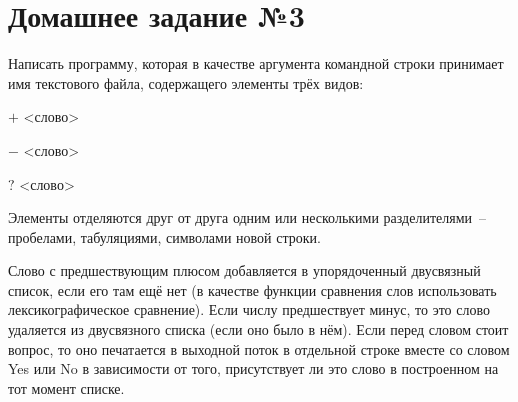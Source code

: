 \section*{Домашнее задание №3}


Написать программу, которая в качестве аргумента командной строки
принимает имя текстового файла, содержащего элементы трёх видов:
\begin{description}
\item{$+$} <слово>
\item{$-$} <слово>
\item{$?$} <слово>
\end{description}

Элементы отделяются друг от друга одним или несколькими
разделителями~-- пробелами, табуляциями, символами новой строки.

Слово
с предшествующим плюсом добавляется в упорядоченный двусвязный
список, если его там ещё нет (в качестве функции сравнения слов
использовать лексикографическое сравнение). Если числу предшествует
минус, то это слово удаляется из двусвязного списка (если оно было в нём).
Если перед словом стоит вопрос, то оно печатается в выходной поток в
отдельной строке вместе со словом Yes или No в зависимости от того,
присутствует ли это слово в построенном на тот момент списке.
